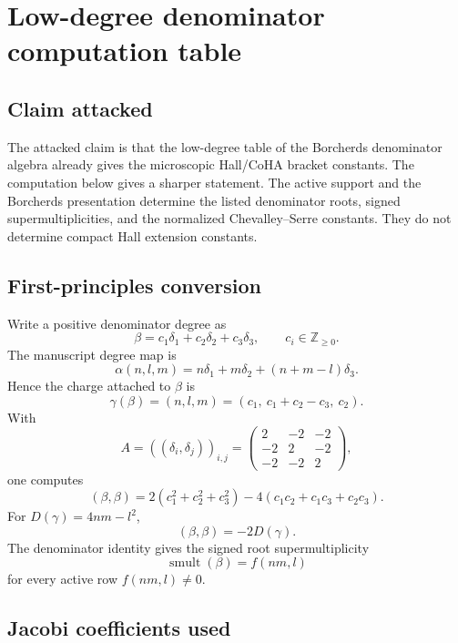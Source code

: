 \section{Low-degree denominator computation table}
\label{sec:denominator-low-degree-computation-table}

\providecommand{\Z}{\mathbb Z}
\providecommand{\R}{\mathbb R}
\providecommand{\La}{\Lambda}
\providecommand{\autcor}{\mathfrak g_{\Delta_5}}
\providecommand{\sdim}{\operatorname{sdim}}
\providecommand{\smult}{\operatorname{smult}}
\providecommand{\ad}{\operatorname{ad}}
\providecommand{\Prim}{\operatorname{Prim}}

\subsection{Claim attacked}

The attacked claim is that the low-degree table of the Borcherds
denominator algebra already gives the microscopic Hall/CoHA bracket
constants.  The computation below gives a sharper statement.  The
active support and the Borcherds presentation determine the listed
denominator roots, signed supermultiplicities, and the normalized
Chevalley--Serre constants.  They do not determine compact Hall
extension constants.

\subsection{First-principles conversion}

Write a positive denominator degree as
$$
\beta=c_1\delta_1+c_2\delta_2+c_3\delta_3,
\qquad c_i\in\Z_{\geq0}.
$$
The manuscript degree map is
$$
\alpha(n,l,m)=n\delta_1+m\delta_2+(n+m-l)\delta_3.
$$
Hence the charge attached to \(\beta\) is
$$
\gamma(\beta)=(n,l,m)=(c_1,\ c_1+c_2-c_3,\ c_2).
$$
With
$$
A=((\delta_i,\delta_j))_{i,j}=
\begin{pmatrix}
2&-2&-2\\
-2&2&-2\\
-2&-2&2
\end{pmatrix},
$$
one computes
$$
(\beta,\beta)
=2(c_1^2+c_2^2+c_3^2)
-4(c_1c_2+c_1c_3+c_2c_3).
$$
For \(D(\gamma)=4nm-l^2\),
$$
(\beta,\beta)=-2D(\gamma).
$$
The denominator identity gives the signed root supermultiplicity
$$
\smult(\beta)=f(nm,l)
$$
for every active row \(f(nm,l)\neq0\).

\subsection{Jacobi coefficients used}

